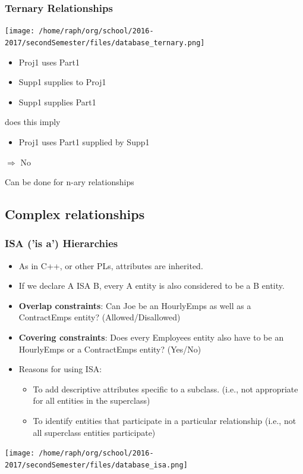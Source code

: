 \documentclass[11pt]{article}
\begin{document}
\subsubsection{Ternary Relationships}
\label{sec:org2437617}
\begin{center}
\texttt{[image: /home/raph/org/school/2016-2017/secondSemester/files/database\_ternary.png]}
\end{center}
\begin{itemize}
\item Proj1 uses Part1
\item Supp1 supplies to Proj1
\item Supp1 supplies Part1
\end{itemize}
does this imply
\begin{itemize}
\item Proj1 uses Part1 supplied by Supp1
\end{itemize}
\(\Rightarrow\) No

Can be done for n-ary relationships
\subsection{Complex relationships}
\label{sec:org92d43d7}
\subsubsection{ISA ('is a') Hierarchies}
\label{sec:org75aa39e}
\begin{itemize}
\item As in C++, or other PLs, attributes are inherited.
\item If we declare A ISA B, every A entity is also considered to be a B entity.

\item \textbf{Overlap constraints}: Can Joe be an HourlyEmps as well as a ContractEmps
entity? (Allowed/Disallowed)
\item \textbf{Covering constraints}: Does every Employees entity also have to be an
HourlyEmps or a ContractEmps entity? (Yes/No)
\item Reasons for using ISA:
\begin{itemize}
\item To add descriptive attributes specific to a subclass. (i.e., not appropriate
for all entities in the superclass)
\item To identify entities that participate in a particular relationship (i.e., not
all superclass entities participate)
\end{itemize}
\end{itemize}
\begin{center}
\texttt{[image: /home/raph/org/school/2016-2017/secondSemester/files/database\_isa.png]}
\end{center}
\end{document}
